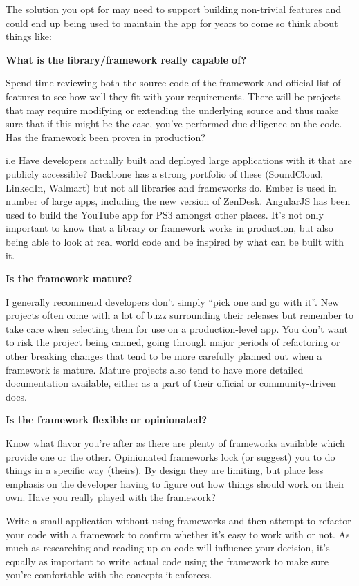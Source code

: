 \documentclass[9pt]{book}
\begin{document}
The solution you opt for may need to support building non-trivial
features and could end up being used to maintain the app for years to
come so think about things like:

\textbf{What is the library/framework really capable of?}

Spend time reviewing both the source code of the framework and official
list of features to see how well they fit with your requirements. There
will be projects that may require modifying or extending the underlying
source and thus make sure that if this might be the case, you've
performed due diligence on the code. Has the framework been proven in
production?

i.e Have developers actually built and deployed large applications with
it that are publicly accessible? Backbone has a strong portfolio of
these (SoundCloud, LinkedIn, Walmart) but not all libraries and
frameworks do. Ember is used in number of large apps, including the new
version of ZenDesk. AngularJS has been used to build the YouTube app for
PS3 amongst other places. It's not only important to know that a library
or framework works in production, but also being able to look at real
world code and be inspired by what can be built with it.

\textbf{Is the framework mature?}

I generally recommend developers don't simply ``pick one and go with
it''. New projects often come with a lot of buzz surrounding their
releases but remember to take care when selecting them for use on a
production-level app. You don't want to risk the project being canned,
going through major periods of refactoring or other breaking changes
that tend to be more carefully planned out when a framework is mature.
Mature projects also tend to have more detailed documentation available,
either as a part of their official or community-driven docs.

\textbf{Is the framework flexible or opinionated?}

Know what flavor you're after as there are plenty of frameworks
available which provide one or the other. Opinionated frameworks lock
(or suggest) you to do things in a specific way (theirs). By design they
are limiting, but place less emphasis on the developer having to figure
out how things should work on their own. Have you really played with the
framework?

Write a small application without using frameworks and then attempt to
refactor your code with a framework to confirm whether it's easy to work
with or not. As much as researching and reading up on code will
influence your decision, it's equally as important to write actual code
using the framework to make sure you're comfortable with the concepts it
enforces.
\end{document}
